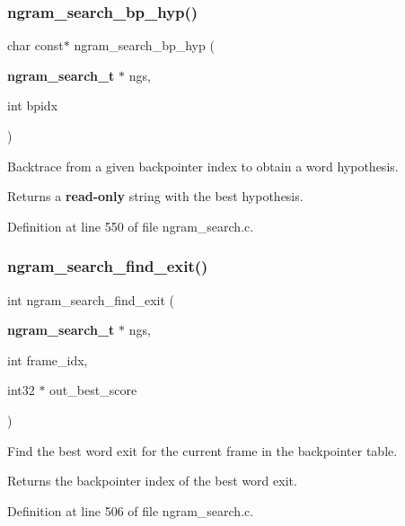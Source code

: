 \subsubsection{ngram\+\_\+search\+\_\+bp\+\_\+hyp()}
{\footnotesize\ttfamily char const$\ast$ ngram\+\_\+search\+\_\+bp\+\_\+hyp (\begin{DoxyParamCaption}\item[{\textbf{ ngram\+\_\+search\+\_\+t} $\ast$}]{ngs,  }\item[{int}]{bpidx }\end{DoxyParamCaption})}



Backtrace from a given backpointer index to obtain a word hypothesis. 

\begin{DoxyReturn}{Returns}
a {\bfseries read-\/only} string with the best hypothesis. 
\end{DoxyReturn}


Definition at line 550 of file ngram\+\_\+search.\+c.

\mbox{\label{ngram__search_8h_aa4b308f06bdf75b2f5eb0f0559f775ae}} 
\subsubsection{ngram\+\_\+search\+\_\+find\+\_\+exit()}
{\footnotesize\ttfamily int ngram\+\_\+search\+\_\+find\+\_\+exit (\begin{DoxyParamCaption}\item[{\textbf{ ngram\+\_\+search\+\_\+t} $\ast$}]{ngs,  }\item[{int}]{frame\+\_\+idx,  }\item[{int32 $\ast$}]{out\+\_\+best\+\_\+score }\end{DoxyParamCaption})}



Find the best word exit for the current frame in the backpointer table. 

\begin{DoxyReturn}{Returns}
the backpointer index of the best word exit. 
\end{DoxyReturn}


Definition at line 506 of file ngram\+\_\+search.\+c.



